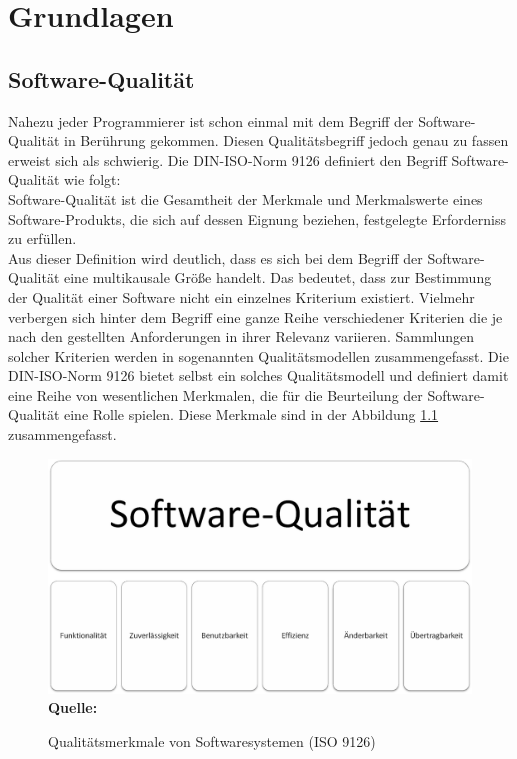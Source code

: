 \chapter{Grundlagen}
\label{sec:grundlagen}


\section{Software-Qualität}
\label{sec:softwarequalität}

Nahezu jeder Programmierer ist schon einmal mit dem Begriff der Software-Qualität in Berührung gekommen. Diesen Qualitätsbegriff jedoch genau zu fassen erweist sich als schwierig.
Die DIN-ISO-Norm 9126 definiert den Begriff Software-Qualität wie folgt:
\\
\glqq Software-Qualität ist die Gesamtheit der Merkmale und Merkmalswerte eines Software-Produkts, die sich auf dessen Eignung beziehen, festgelegte Erforderniss zu erfüllen.\grqq \cite{iso/iec_iso/iec_2001}
\\
Aus dieser Definition wird deutlich, dass es sich bei dem Begriff der Software-Qualität eine multikausale Größe handelt. Das bedeutet, dass zur Bestimmung der Qualität einer Software nicht ein einzelnes Kriterium existiert. Vielmehr verbergen sich hinter dem Begriff eine ganze Reihe verschiedener Kriterien die je nach den gestellten Anforderungen in ihrer Relevanz variieren.\cite[vgl. Seite 6 ff.]{hoffmann_software-qualitat_2013}
Sammlungen solcher Kriterien werden in sogenannten Qualitätsmodellen zusammengefasst. Die DIN-ISO-Norm 9126 bietet selbst ein solches Qualitätsmodell und definiert damit eine Reihe von wesentlichen Merkmalen, die für die Beurteilung der Software-Qualität eine Rolle spielen. Diese Merkmale sind in der Abbildung \ref{fig:qualitaetsmerkmaleVonSoftwaresystemen} zusammengefasst.
\begin{figure}[htb]
  \centering  
  \includegraphics[scale=0.6]{img/softwarequalitaet9126.png}\\
  \footnotesize\sffamily\textbf{Quelle:} \cite{iso/iec_iso/iec_2001}
  \caption{Qualitätsmerkmale von Softwaresystemen (ISO 9126)}
  \label{fig:qualitaetsmerkmaleVonSoftwaresystemen}
\end{figure}
